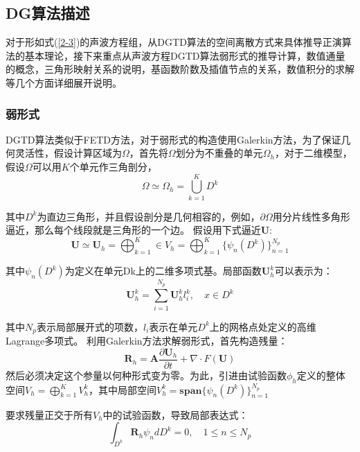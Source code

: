 \documentclass[12pt]{article}
\begin{document}
\subsection{DG算法描述}
对于形如式(\ref{2-3})的声波方程组，从DGTD算法的空间离散方式来具体推导正演算法的基本理论，接下来重点从声波方程DGTD算法弱形式的推导计算，数值通量的概念，三角形映射关系的说明，基函数阶数及插值节点的关系，数值积分的求解等几个方面详细展开说明。
\subsubsection{弱形式}
DGTD算法类似于FETD方法，对于弱形式的构造使用Galerkin方法，为了保证几何灵活性，假设计算区域为$\Omega$，首先将$\Omega$划分为不重叠的单元$\Omega_h$，对于二维模型，假设$\Omega$可以用$K$个单元作三角剖分，
\begin{equation}\label{2-4}
\Omega \simeq \Omega_h = \bigcup_{k=1}^KD^k
\end{equation}
\par
其中$D^k$为直边三角形，并且假设剖分是几何相容的，例如，$\partial \Omega$用分片线性多角形逼近，那么每个线段就是三角形的一个边。
假设用下式逼近$\boldsymbol{U}$:
\begin{equation}\label{2-5}
\boldsymbol{U} \simeq \boldsymbol{U}_h=\bigoplus_{k=1}^K \in V_h=\bigoplus_{k=1}^K\{\psi_n(D^k)\}_{n=1}^{N_p}
\end{equation}
\par
其中$\psi_n(D^k)$为定义在单元Dk上的二维多项式基。局部函数$\boldsymbol{U}_h^k$可以表示为：
\begin{equation}\label{2-6}
\boldsymbol{U}_h^k=\sum_{i=1}^{N_p}\boldsymbol{U}_h^k l_i^k,\quad x \in D^k
\end{equation}
\par
其中$N_p$表示局部展开式的项数，$l_i$表示在单元$D^k$上的网格点处定义的高维Lagrange多项式。
利用Galerkin方法求解弱形式，首先构造残量：
\begin{equation}\label{2-7}
\boldsymbol{R}_h=\boldsymbol{A}\frac{\partial \boldsymbol{U}_h}{\partial t}+\nabla \cdot F(\boldsymbol{U})
\end{equation}
然后必须决定这个参量以何种形式变为零。为此，引进由试验函数$\phi_h$定义的整体空间$V_h=\bigoplus_{k=1}^K V_h^k$，其中局部空间$V_h^k=\mathbf{span}\{\psi_n(D^k)\}_{n=1}^{N_p}$
\par
要求残量正交于所有$V_h$中的试验函数，导致局部表达式：
\begin{equation}\label{2-8}
\int_{D^k}\boldsymbol{R}_h \psi_n dD^k=0,\quad 1 \leq n \leq N_p
\end{equation}
\end{document}
